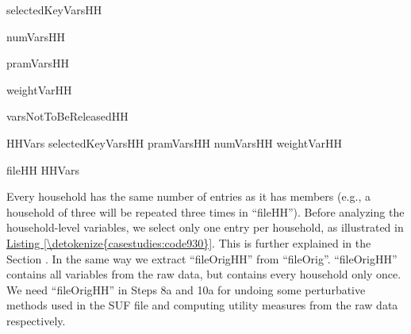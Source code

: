 \documentclass[letterpaper,10pt,english]{sphinxmanual}
\begin{document}
\begin{sphinxVerbatim}[commandchars=\\\{\},numbers=left,firstnumber=1,stepnumber=1]
selectedKeyVarsHH    

numVarsHH   

pramVarsHH     
                    

weightVarHH  

varsNotToBeReleasedHH    

HHVars   selectedKeyVarsHH pramVarsHH numVarsHH weightVarHH

fileHH  \PYG{p}{[}HHVars\PYG{p}{]}
\end{sphinxVerbatim}

Every household has the same number of entries as it has members (e.g.,
a household of three will be repeated three times in “fileHH”). Before
analyzing the household-level variables, we select only one entry per
household, as illustrated in \hyperref[\detokenize{casestudies:code930}]{Listing \ref{\detokenize{casestudies:code930}}}. This is further explained in
the Section .
In the same way we extract “fileOrigHH” from “fileOrig”.
“fileOrigHH” contains all variables from the raw data, but contains
every household only once. We need “fileOrigHH” in Steps 8a and 10a for
undoing some perturbative methods used in the SUF file and computing
utility measures from the raw data respectively.
\end{document}

